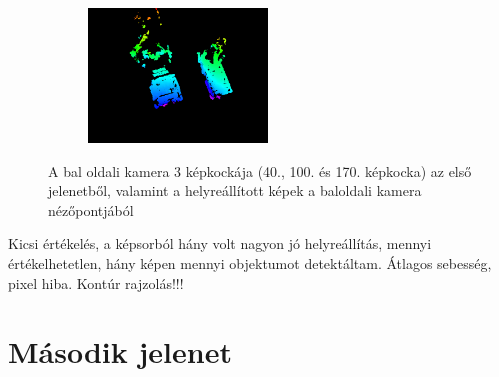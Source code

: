 \begin{figure}[tbh]
\begin{subfigure}[b]{.32\linewidth}
  \end{subfigure}
\begin{subfigure}[b]{.32\linewidth}
	\centering
	\includegraphics[width=135pt]{figures/vis_223.png}
  \end{subfigure}
\caption{A bal oldali kamera 3 képkockája (40., 100. és 170. képkocka) az első jelenetből, valamint a helyreállított képek a baloldali kamera nézőpontjából \label{fig:scene1_frames}}
\end{figure}

{\color{red} Kicsi értékelés, a képsorból hány volt nagyon jó helyreállítás, mennyi értékelhetetlen, hány képen mennyi objektumot detektáltam. Átlagos sebesség, pixel hiba. Kontúr rajzolás!!!

\section{Második jelenet}

}